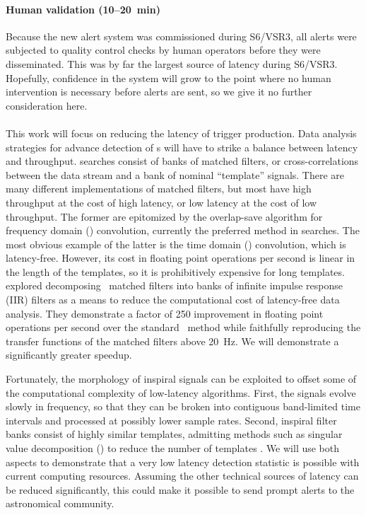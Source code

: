\paragraph{Human validation (10--20~min)}%
Because the new alert system was commissioned during S6/VSR3, all alerts were subjected
to quality control checks by human operators before they were disseminated.
This was by far the largest source of latency during S6/VSR3.
Hopefully, confidence in the system will grow to the point where no human intervention
is necessary before alerts are sent, so we give it no further consideration here.

\paragraph{}

This work will focus on reducing the latency of trigger production.  Data analysis
strategies for advance detection of \CBC{}s will have to strike a balance between latency
and throughput. \CBC{} searches consist of banks of
matched filters, or cross-correlations between the data stream and a bank of
nominal ``template'' signals.  There are many different implementations of
matched filters, but most have high throughput at the cost of high latency, or
low latency at the cost of low throughput.  The former are epitomized by the
overlap-save algorithm for frequency domain (\FD) convolution, currently the
preferred method in \GW{} searches.  The most obvious example of the latter is
the time domain (\TD) convolution, which is latency-free.  However, its cost in floating
point operations per second is linear in the length of the templates, so it is
prohibitively expensive for long templates.  \citet{shaunIIR} explored decomposing
\CBC\ matched filters into banks of infinite impulse response (IIR)
filters as a means to reduce the computational cost of latency-free data analysis.  They
demonstrate a factor of 250 improvement in floating point operations per second
over the standard \TD\ method while faithfully reproducing the transfer functions of the
matched filters above 20~Hz.  We will demonstrate a significantly greater speedup.

Fortunately, the morphology of inspiral signals can be exploited to offset some
of the computational complexity of low-latency algorithms.  First, the signals
evolve slowly in frequency, so that they can be broken into contiguous
band-limited time intervals and processed at possibly lower sample rates.
Second, inspiral filter banks consist of highly similar templates, admitting
methods such as singular value decomposition (\SVD{}) to reduce the number of
templates \citep{Cannon:2010p10398}. We will use both aspects to demonstrate
that a very low latency detection statistic is possible with current computing
resources.  Assuming the other technical sources of latency can be reduced
significantly, this could make it possible to send prompt alerts to the
astronomical community.

